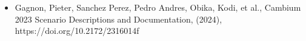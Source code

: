 \begin{itemize}
\item Gagnon, Pieter, Sanchez Perez, Pedro Andres, Obika, Kodi, et al., Cambium 2023 Scenario Descriptions and Documentation, (2024), https://doi.org/10.2172/2316014f
\end{itemize}
